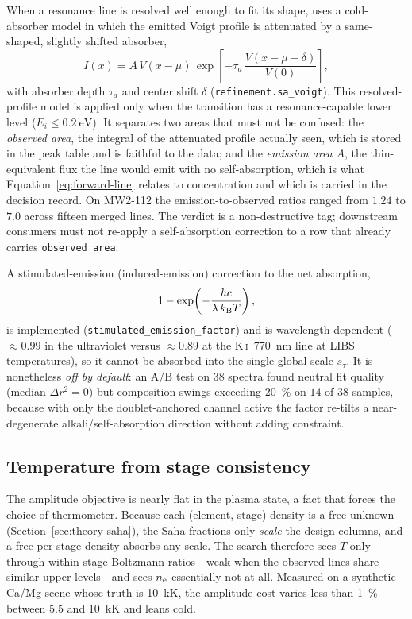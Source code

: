 When a resonance line is resolved well enough to fit its shape, \alibz{} uses a
cold-absorber model in which the emitted Voigt profile is attenuated by a
same-shaped, slightly shifted absorber,
%
\begin{equation}
  \label{eq:sa-voigt}
  I(x) = A\,V(x-\mu)\,
    \exp\!\left[-\tau_a\,\frac{V(x-\mu-\delta)}{V(0)}\right],
\end{equation}
%
with absorber depth $\tau_a$ and center shift $\delta$ (\texttt{refinement.sa\_voigt}).
This resolved-profile model is applied only when the transition has a resonance-capable
lower level ($E_i\le\SI{0.2}{\electronvolt}$). It separates two areas that must not be
confused: the \emph{observed area}, the integral of the attenuated profile actually
seen, which is stored in the peak table and is faithful to the data; and the
\emph{emission area} $A$, the thin-equivalent flux the line would emit with no
self-absorption, which is what Equation~\eqref{eq:forward-line} relates to
concentration and which is carried in the decision record. On MW2-112 the
emission-to-observed ratios ranged from $1.24$ to $7.0$ across fifteen merged lines.
The verdict is a non-destructive tag; downstream consumers must not re-apply a
self-absorption correction to a row that already carries \texttt{observed\_area}.

A stimulated-emission (induced-emission) correction to the net absorption,
%
\begin{equation}
  \label{eq:stim}
  1 - \exp\!\left(-\frac{hc}{\lambda\,k_{\mathrm{B}} T}\right),
\end{equation}
%
is implemented (\texttt{stimulated\_emission\_factor}) and is wavelength-dependent
($\approx0.99$ in the ultraviolet versus $\approx0.89$ at the
\mbox{K\,\textsc{i}}~\SI{770}{\nano\meter} line at LIBS temperatures), so it cannot be
absorbed into the single global scale $s_\tau$. It is nonetheless \emph{off by
default}: an A/B test on 38 spectra found neutral fit quality (median
$\Delta r^2 = 0$) but composition swings exceeding \SI{20}{\percent} on $14$ of $38$
samples, because with only the doublet-anchored channel active the factor re-tilts a
near-degenerate alkali/self-absorption direction without adding constraint.

\subsection{Temperature from stage consistency}
\label{sec:theory-thermometer}

The amplitude objective is nearly flat in the plasma state, a fact that forces the
choice of thermometer. Because each (element, stage) density is a free unknown
(Section~\ref{sec:theory-saha}), the Saha fractions only \emph{scale} the design
columns, and a free per-stage density absorbs any scale. The search therefore sees
$T$ only through within-stage Boltzmann ratios---weak when the observed lines share
similar upper levels---and sees $n_{\mathrm{e}}$ essentially not at all. Measured on a synthetic
Ca/Mg scene whose truth is \SI{10}{\kilo\kelvin}, the amplitude cost varies less than
\SI{1}{\percent} between $5.5$ and \SI{10}{\kilo\kelvin} and leans cold.

